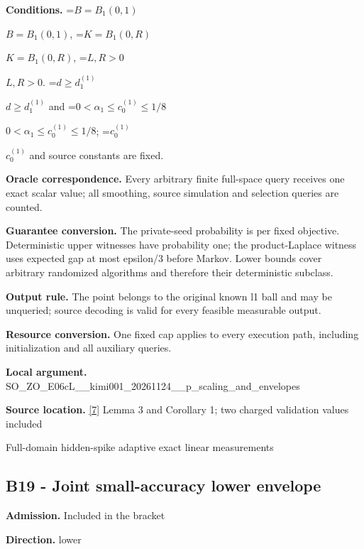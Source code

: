 \documentclass[10pt,a4paper]{article}
\newcommand{\AtlasMath}[1]{\par\begingroup\centering\setbox0=\hbox{$\displaystyle #1$}\ifdim\wd0>1.4\linewidth\typeout{ATLAS WIDE FORMULA: \the\wd0}\fi\ifdim\wd0>\linewidth\resizebox{\linewidth}{!}{\box0}\else\box0\fi\par\endgroup}
\newcommand{\AtlasInlineMath}[1]{\begingroup\setbox0=\hbox{$#1$}\ifdim\wd0>.4\linewidth\endgroup\AtlasMath{#1}\else\endgroup$#1$\fi}
\begin{document}
\textbf{Conditions.} \AtlasInlineMath{B=B_1(0,1)}, \AtlasInlineMath{K=B_1(0,R)}, \AtlasInlineMath{L,R>0}. \AtlasInlineMath{d\ge d_1^{(1)}} and \AtlasInlineMath{0<\alpha_1\le c_0^{(1)}\le1/8}; \AtlasInlineMath{c_0^{(1)}} and source constants are fixed.



\textbf{Oracle correspondence.} Every arbitrary finite full-space query receives one exact scalar value; all smoothing, source simulation and selection queries are counted.



\textbf{Guarantee conversion.} The private-seed probability is per fixed objective. Deterministic upper witnesses have probability one; the product-Laplace witness uses expected gap at most epsilon/3 before Markov. Lower bounds cover arbitrary randomized algorithms and therefore their deterministic subclass.



\textbf{Output rule.} The point belongs to the original known l1 ball and may be unqueried; source decoding is valid for every feasible measurable output.



\textbf{Resource conversion.} One fixed cap applies to every execution path, including initialization and all auxiliary queries.



\textbf{Local argument.} SO\_ZO\_E06cL\_\_kimi001\_202\allowbreak{}61124\_\_p\_scaling\_and\_env\allowbreak{}elopes



\textbf{Source location.} \href{https://github.com/WU-Wendao/Colombo/blob/main/colombo_sensorium/Complexity_altas/data/sources/colombo/COLOMBO_KIMI_001/kimi_001.pdf}{[7]} Lemma 3 and Corollary 1; two charged validation values included



Full-domain hidden-spike adaptive exact linear measurements



\subsection{B19 - Joint small-accuracy lower envelope}


\textbf{Admission.} Included in the bracket



\textbf{Direction.} lower
\end{document}
